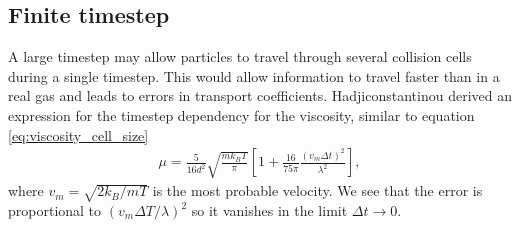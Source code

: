 \subsection{Finite timestep}
A large timestep may allow particles to travel through several collision cells during a single timestep. This would allow information to travel faster than in a real gas and leads to errors in transport coefficients. Hadjiconstantinou \cite{hadjiconstantinou2000analysis} derived an expression for the timestep dependency for the viscosity, similar to equation \eqref{eq:viscosity_cell_size}
\begin{align}
	\mu = \frac{5}{16d^2}\sqrt{\frac{mk_B T}{\pi}} \left [1 + \frac{16}{75\pi}\frac{(v_m\Delta t)^2}{\lambda^2}\right],
\end{align}
where $v_m=\sqrt{2k_B/mT}$ is the most probable velocity. We see that the error is proportional to $(v_m\Delta T/\lambda)^2$ so it vanishes in the limit $\Delta t\rightarrow 0$. 